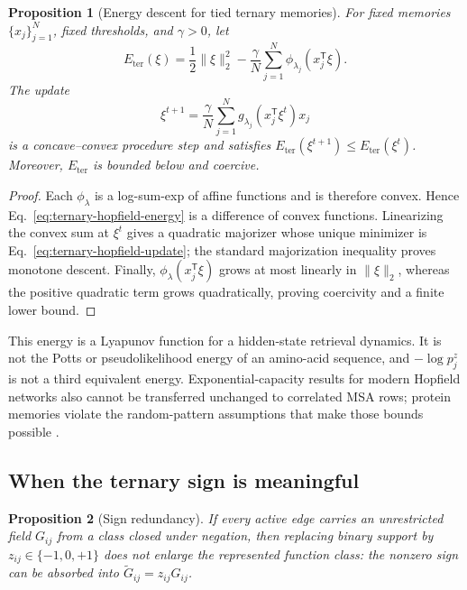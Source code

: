\documentclass[10pt,twocolumn]{article}
\newcommand{\1}{\mathbf 1}
\newtheorem{proposition}{Proposition}
\theoremstyle{remark}
\begin{document}
\begin{proposition}[Energy descent for tied ternary memories]
\label{prop:ternary-hopfield-descent}
For fixed memories $\{x_j\}_{j=1}^{N}$, fixed thresholds, and $\gamma>0$, let
\begin{equation}
E_{\mathrm{ter}}(\xi)=\frac12\|\xi\|_2^2
-\frac{\gamma}{N}\sum_{j=1}^{N}
\phi_{\lambda_j}(x_j^{\mathsf T}\xi).
\label{eq:ternary-hopfield-energy}
\end{equation}
The update
\begin{equation}
\xi^{t+1}=\frac{\gamma}{N}\sum_{j=1}^{N}
g_{\lambda_j}(x_j^{\mathsf T}\xi^t)x_j
\label{eq:ternary-hopfield-update}
\end{equation}
is a concave--convex procedure step and satisfies
$E_{\mathrm{ter}}(\xi^{t+1})\leq E_{\mathrm{ter}}(\xi^t)$.  Moreover,
$E_{\mathrm{ter}}$ is bounded below and coercive.
\end{proposition}

\begin{proof}
Each $\phi_{\lambda}$ is a log-sum-exp of affine functions and is therefore convex.  Hence
Eq.~\ref{eq:ternary-hopfield-energy} is a difference of convex functions.  Linearizing the convex
sum at $\xi^t$ gives a quadratic majorizer whose unique minimizer is
Eq.~\ref{eq:ternary-hopfield-update}; the standard majorization inequality proves monotone descent.
Finally, $\phi_{\lambda}(x_j^{\mathsf T}\xi)$ grows at most linearly in $\|\xi\|_2$, whereas the
positive quadratic term grows quadratically, proving coercivity and a finite lower bound.
\end{proof}

This energy is a Lyapunov function for a hidden-state retrieval dynamics.  It is not the Potts or
pseudolikelihood energy of an amino-acid sequence, and $-\log p_j^z$ is not a third equivalent
energy.  Exponential-capacity results for modern Hopfield networks also cannot be transferred
unchanged to correlated MSA rows; protein memories violate the random-pattern assumptions that
make those bounds possible \cite{ramsauer2021}.

\subsection{When the ternary sign is meaningful}

\begin{proposition}[Sign redundancy]
If every active edge carries an unrestricted field $G_{ij}$ from a class closed under negation,
then replacing binary support by $z_{ij}\in\{-1,0,+1\}$ does not enlarge the represented function
class: the nonzero sign can be absorbed into $\widetilde G_{ij}=z_{ij}G_{ij}$.
\end{proposition}
\end{document}
